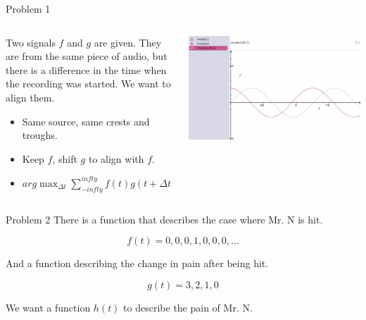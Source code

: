 \documentclass[aspectratio=1610,xcolor={dvipsnames},hyperref={colorlinks,unicode,linkcolor=violet,anchorcolor=BlueViolet,citecolor=YellowOrange,filecolor=black,urlcolor=Aquamarine}]{beamer}
\begin{document}
\begin{frame}[label={sec:orgb4e35dd}]{Problem 1}
\begin{columns}
\begin{column}{0.4\columnwidth}
Two signals \(f\) and \(g\) are given.  They are from the same piece of audio, but there is a difference in the time when the recording was started.
We want to align them.

\begin{itemize}
\item Same source, same crests and troughs.
\item Keep \(f\), shift \(g\) to align with \(f\).
\item \(arg \max_{\Delta t} \sum_{-infty}^{infty}f(t)g(t + \Delta t)\)
\end{itemize}
\end{column}

\begin{column}{0.5\columnwidth}
\begin{center}
\includegraphics[width=.9\linewidth]{./p2.png}
\end{center}
\end{column}
\end{columns}
\end{frame}

\begin{frame}[label={sec:org82d1935}]{Problem 2}
There is a function that describes the case where Mr. N is hit.

\[f(t) = 0, 0, 0, 1, 0, 0, 0, ...\]

And a function describing the change in pain after being hit.

\[g(t) = 3, 2, 1, 0\]

We want a function \(h(t)\) to describe the pain of Mr. N.
\end{frame}
\end{document}
